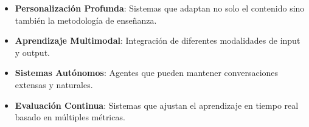 \begin{itemize}
  \item \textbf{Personalización Profunda}: Sistemas que adaptan no solo el contenido sino también la metodología de enseñanza.

  \item \textbf{Aprendizaje Multimodal}: Integración de diferentes modalidades de input y output.

  \item \textbf{Sistemas Autónomos}: Agentes que pueden mantener conversaciones extensas y naturales.

  \item \textbf{Evaluación Continua}: Sistemas que ajustan el aprendizaje en tiempo real basado en múltiples métricas.
\end{itemize}